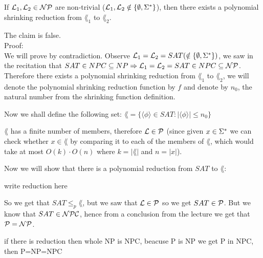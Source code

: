 If $\mathcal{L}_1, \mathcal{L}_2 \in \mathcal{N}\mathcal{P}$ are non-trivial ($\mathcal{L}_1, \mathcal{L}_2 \notin \{\emptyset, \Sigma^*\}$), then there exists a polynomial shrinking
reduction from $\lang_1$ to $\lang_2$.

The claim is false. \\

Proof: \\
We will prove by contradiction. Observe $\mathcal{L}_1 = \mathcal{L}_2 = SAT (\notin \{\emptyset, \Sigma^*\})$, we saw in the recitation that
$SAT \in NPC \subseteq NP \Rightarrow \mathcal{L}_1 = \mathcal{L}_2 = SAT \in NPC \subseteq \mathcal{N}\mathcal{P}$. Therefore there exists a polynomial shrinking
reduction from $\lang_1$ to $\lang_2$, we will denote the polynomial shrinking reduction function by $f$ and denote by $n_0$,
the natural number from the shrinking function definition.

Now we shall define the following set:
$
    \lang = \{\langle \phi \rangle \in SAT: |\langle \phi \rangle| \leq n_0 \}
$


$\lang$ has a finite number of members, therefore $\mathcal{L} \in \mathcal{P}$ (since given $x \in \Sigma^*$ we can check whether $x \in \lang$ by
comparing it to each of the members of $\lang$, which would take at most $O(k) \cdot O(n)$ where $k=|\lang|$ and $n=|x|$).

Now we will show that there is a polynomial reduction from $SAT$ to $\lang$:


{
\color{red}
write reduction here
}










So we get that $SAT \leq_p \lang$, but we saw that $\mathcal{L} \in \mathcal{P}$ so we get $SAT \in \mathcal{P}$.
But we know that $SAT \in \mathcal{N}\mathcal{P}\mathcal{C}$, hence from a conclusion from the lecture we get that $\mathcal{P} = \mathcal{N}\mathcal{P}$.


if there is reduction then whole NP is NPC, beacuse P is NP we get P in NPC, then P=NP=NPC